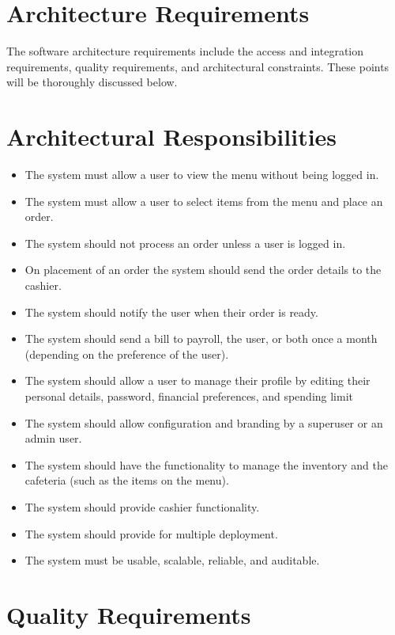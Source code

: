 \documentclass[a4paper,12pt]{article}
\begin{document}
\section{Architecture Requirements}
The software architecture requirements include the access and integration requirements, quality
requirements, and architectural constraints. These points will be thoroughly discussed below.

\section{Architectural Responsibilities}
\begin{itemize}

\item The system must allow a user to view the menu without being logged in.
\item The system must allow a user to select items from the menu and place an order.
\item The system should not process an order unless a user is logged in.
\item On placement of an order the system should send the order details to the cashier.
\item The system should notify the user when their order is ready.
\item The system should send a bill to payroll, the user, or both once a month (depending on the preference of the user).
\item The system should allow a user to manage their profile by editing their personal details, password, financial preferences, and spending limit
\item The system should allow configuration and branding by a superuser or an admin user.
\item The system should have the functionality to manage the inventory and the cafeteria (such as the items on the menu).
\item The system should provide cashier functionality.
\item The system should provide for multiple deployment.
\item The system must be usable, scalable, reliable, and auditable.

\end{itemize}

\section{Quality Requirements}
\end{document}
